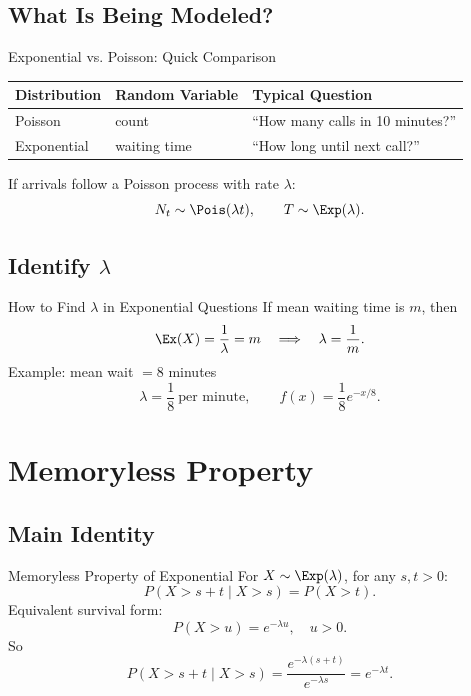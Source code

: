 \documentclass[aspectratio=169]{beamer}
\begin{document}
\subsection{What Is Being Modeled?}
\begin{frame}{Exponential vs. Poisson: Quick Comparison}
  \begin{center}
  \begin{tabular}{l|l|l}
    \textbf{Distribution} & \textbf{Random Variable} & \textbf{Typical Question} \\
    \hline
    Poisson & count & ``How many calls in 10 minutes?'' \\
    Exponential & waiting time & ``How long until next call?'' \\
  \end{tabular}
  \end{center}
  \vspace{2mm}
  If arrivals follow a Poisson process with rate \(\lambda\):
  \[
    N_t\sim\Pois(\lambda t),\qquad T\sim\Exp(\lambda).
  \]
\end{frame}

\subsection{Identify \(\lambda\)}
\begin{frame}{How to Find \(\lambda\) in Exponential Questions}
  If mean waiting time is \(m\), then
  \[
    \Ex(X)=\frac{1}{\lambda}=m
    \quad\Longrightarrow\quad
    \lambda=\frac{1}{m}.
  \]
  \vspace{2mm}
  Example: mean wait \(=8\) minutes
  \[
    \lambda=\frac{1}{8}\ \text{per minute},
    \qquad
    f(x)=\frac{1}{8}e^{-x/8}.
  \]
\end{frame}

\section{Memoryless Property}

\subsection{Main Identity}
\begin{frame}{Memoryless Property of Exponential}
  For \(X\sim\Exp(\lambda)\), for any \(s,t>0\):
  \[
    P(X>s+t\mid X>s)=P(X>t).
  \]
  Equivalent survival form:
  \[
    P(X>u)=e^{-\lambda u},\quad u>0.
  \]
  So
  \[
    P(X>s+t\mid X>s)=\frac{e^{-\lambda(s+t)}}{e^{-\lambda s}}=e^{-\lambda t}.
  \]
\end{frame}
\end{document}

